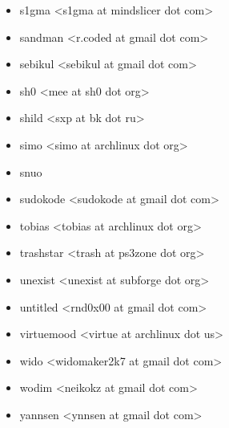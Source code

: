 \begin{itemize}
\item  s1gma <s1gma at mindslicer dot com>
\item  sandman <r.coded at gmail dot com>
\item  sebikul <sebikul at gmail dot com>
\item  sh0 <mee at sh0 dot org>
\item  shild <sxp at bk dot ru>
\item  simo <simo at archlinux dot org>
\item  snuo
\item  sudokode <sudokode at gmail dot com>
\item  tobias <tobias at archlinux dot org>
\item  trashstar <trash at ps3zone dot org>
\item  unexist <unexist at subforge dot org>
\item  untitled <rnd0x00 at gmail dot com>
\item  virtuemood <virtue at archlinux dot us>
\item  wido <widomaker2k7 at gmail dot com>
\item  wodim <neikokz at gmail dot com>
\item  yannsen <ynnsen at gmail dot com>
\end{itemize}
